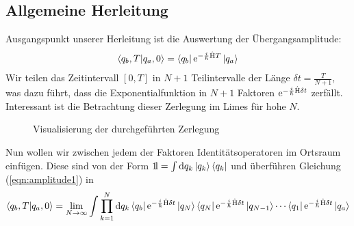 \subsection{Allgemeine Herleitung}
Ausgangspunkt unserer Herleitung ist die Auswertung der Übergangsamplitude:
\begin{align}
	\braket{q_b,T}{q_a,0} = \bra{q_b}\operatorname{e}^{-\frac{i}{\hbar}\hat{\operatorname{H}}T}\ket{q_a} \label{eqn:amplitude1}
\end{align}
Wir teilen das Zeitintervall $[0,T]$ in $N+1$ Teilintervalle der Länge $\delta t = \frac{T}{N+1}$, was dazu führt, dass die Exponentialfunktion in $N+1$ Faktoren $\operatorname{e}^{-\frac{i}{\hbar}\hat{\operatorname{H}}\delta t}$ zerfällt. Interessant ist die Betrachtung dieser Zerlegung im Limes für hohe $N$. 
\begin{figure}[H]
\centering
{}
\caption{Visualisierung der durchgeführten Zerlegung}
\end{figure}
Nun wollen wir zwischen jedem der Faktoren Identitätsoperatoren im Ortsraum einfügen. Diese sind von der Form 
	$\mathrm{1\!l} = \int \dd q_k \ket{q_k}\bra{q_k}$ und überführen Gleichung (\ref{eqn:amplitude1}) in 
\begin{align}
	\braket{q_b,T}{q_a,0} = \lim_{N\rightarrow\infty} \int \prod_{k=1}^{N} \dd q_k \bra{q_b}\operatorname{e}^{-\frac{i}{\hbar}\hat{\operatorname{H}}\delta t}\ket{q_N}\bra{q_N}\operatorname{e}^{-\frac{i}{\hbar}\hat{\operatorname{H}}\delta t}\ket{q_{N-1}} \cdots \bra{q_1}\operatorname{e}^{-\frac{i}{\hbar}\hat{\operatorname{H}}\delta t}\ket{q_a} \label{eqn:amplitude2}
\end{align}

